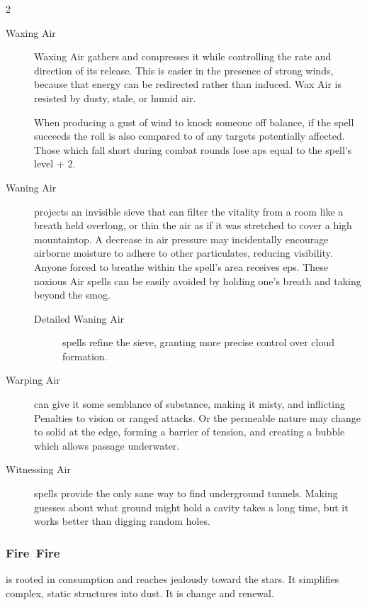 \begin{multicols}{2}
\begin{description}
  \item[Waxing Air]
  Waxing Air gathers and compresses it while controlling the rate and direction
  of its release. This is easier in the presence of strong winds, because that
  energy can be redirected rather than induced. Wax Air is resisted by dusty,
  stale, or humid air.

  When producing a gust of wind to knock someone off balance, if the spell
  succeeds the roll is also compared to  of any
  targets potentially affected.  Those which fall short during combat
  \glspl{round} lose \glspl{ap} equal to the \gls{spell}'s level + 2.

  \item[Waning Air]
  projects an invisible sieve that can filter the vitality from a room like a breath held overlong, or thin the air as if it was stretched to cover a high mountaintop.
  A decrease in air pressure may incidentally encourage airborne moisture to adhere to other particulates, reducing visibility.
  Anyone forced to breathe within the spell's area receives \glspl{ep}.
  These noxious Air \glspl{spell} can be easily avoided by holding one's breath%
  and taking  beyond the smog.
  \begin{description}
    \item[Detailed Waning Air]
    \glspl{spell} refine the sieve, granting more precise control over cloud formation.
  \end{description}

  \item[Warping Air]
  can give it some semblance of substance, making it misty, and inflicting Penalties to vision or ranged attacks.
  Or the permeable nature may change to solid at the edge, forming a barrier of tension, and creating a bubble which allows passage underwater.

  \item[Witnessing Air]
  \glspl{spell} provide the only sane way to find underground tunnels.
  Making guesses about what ground might hold a cavity takes a long time, but it works better than digging random holes.
\end{description}

\subsubsection[Fire]{\gls{Fire}~Fire}
is rooted in consumption and reaches jealously toward the stars.
It simplifies complex, static structures into dust.
It is change and renewal.


\end{multicols}
